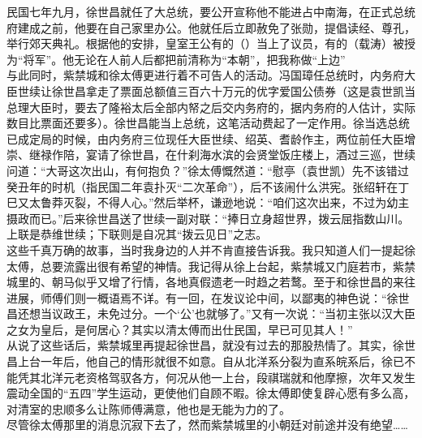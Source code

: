 民国七年九月，徐世昌就任了大总统，要公开宣称他不能进占中南海，在正式总统府建成之前，他要在自己家里办公。他就任后立即赦免了张勋，提倡读经、尊孔，举行郊天典礼。根据他的安排，皇室王公有的（）当上了议员，有的（载涛）被授为“将军”。他无论在人前人后都把前清称为“本朝”，把我称做“上边”\\

与此同时，紫禁城和徐太傅更进行着不可告人的活动。冯国璋任总统时，内务府大臣世续让徐世昌拿走了票面总额值三百六十万元的优字爱国公债券（这是袁世凯当总理大臣时，要去了隆裕太后全部内帑之后交内务府的，据内务府的人估计，实际数目比票面还要多）。徐世昌能当上总统，这笔活动费起了一定作用。徐当选总统已成定局的时候，由内务府三位现任大臣世续、绍英、耆龄作主，两位前任大臣增崇、继禄作陪，宴请了徐世昌，在什刹海水滨的会贤堂饭庄楼上，酒过三巡，世续问道：“大哥这次出山，有何抱负？”徐太傅慨然道：“慰亭（袁世凯）先不该错过癸丑年的时机（指民国二年袁扑灭“二次革命”），后不该闹什么洪宪。张绍轩在丁巳又太鲁莽灭裂，不得人心。”然后举杯，谦逊地说：“咱们这次出来，不过为幼主摄政而已。”后来徐世昌送了世续一副对联：“捧日立身超世界，拨云屈指数山川。上联是恭维世续；下联则是自况其“拨云见日”之志。\\

这些千真万确的故事，当时我身边的人并不肯直接告诉我。我只知道人们一提起徐太傅，总要流露出很有希望的神情。我记得从徐上台起，紫禁城又门庭若市，紫禁城里的、朝马似乎又增了行情，各地真假遗老一时趋之若鹜。至于和徐世昌的来往进展，师傅们则一概语焉不详。有一回，在发议论中间，以鄙夷的神色说：“徐世昌还想当议政王，未免过分。一个‘公’也就够了。”又有一次说：“当初主张以汉大臣之女为皇后，是何居心？其实以清太傅而出仕民国，早已可见其人！”\\

从说了这些话后，紫禁城里再提起徐世昌，就没有过去的那股热情了。其实，徐世昌上台一年后，他自己的情形就很不如意。自从北洋系分裂为直系皖系后，徐已不能凭其北洋元老资格驾驭各方，何况从他一上台，段祺瑞就和他摩擦，次年又发生震动全国的“五四”学生运动，更使他们自顾不暇。徐太傅即使复辟心愿有多么高，对清室的忠顺多么让陈师傅满意，他也是无能为力的了。\\

尽管徐太傅那里的消息沉寂下去了，然而紫禁城里的小朝廷对前途并没有绝望……